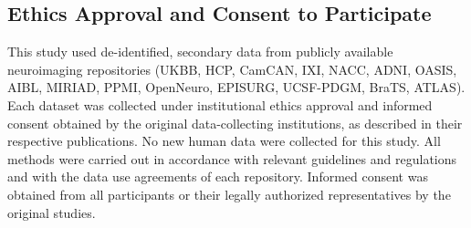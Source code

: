 \documentclass[pdflatex,sn-nature]{sn-jnl}%
\newif\ifhighlight
\newcommand{\rev}[1]{\ifhighlight{\color{blue}{}#1}\else#1\fi}%
\newcommand{\revnote}[1]{\ifhighlight{\color{magenta}\textbf{[#1]}}\fi}
\theoremstyle{thmstyleone}%
\theoremstyle{thmstyletwo}%
\theoremstyle{thmstylethree}%
\begin{document}
\subsection*{Ethics Approval and Consent to Participate}
This study used de-identified, secondary data from publicly available neuroimaging repositories (UKBB, HCP, CamCAN, IXI, NACC, ADNI, OASIS, AIBL, MIRIAD, PPMI, OpenNeuro, EPISURG, UCSF-PDGM, BraTS, ATLAS). Each dataset was collected under institutional ethics approval and informed consent obtained by the original data-collecting institutions, as described in their respective publications. No new human data were collected for this study. \rev{All methods were carried out in accordance with relevant guidelines and regulations and with the data use agreements of each repository. Informed consent was obtained from all participants or their legally authorized representatives by the original studies.}\revnote{Authors: Scientific Reports asks for the name of the institutional committee that approved or exempted this secondary analysis; please add it here}




\end{document}

